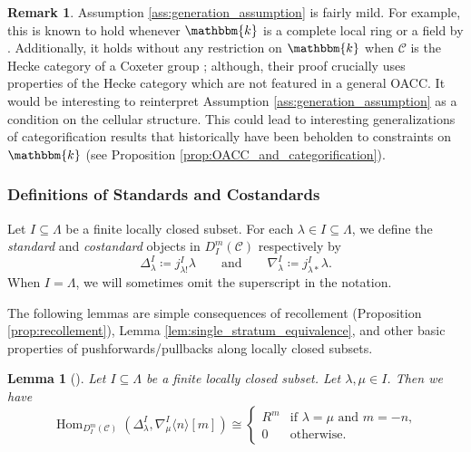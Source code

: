 \documentclass{amsart}
\renewcommand{\k}{\mathbbm{k}}
\newcommand{\scrC}{\mathcal{C}}
\DeclareMathOperator{\Hom}{Hom}
\newtheorem{lemma}[subsubsection]{Lemma}
\theoremstyle{definition}
\newtheorem{remark}[subsubsection]{Remark}
\numberwithin{equation}{subsection}
\begin{document}
\begin{remark}
    Assumption \ref{ass:generation_assumption} is fairly mild. For example, this is known to hold whenever $\k$ is a complete local ring or a field by \cite[Proposition 2.24]{EL}.
    Additionally, it holds without any restriction on $\k$ when $\scrC$ is the Hecke category of a Coxeter group \cite[Lemma 6.2]{ARV}; although, their proof crucially uses properties of the Hecke category which are not featured in a general OACC.
    It would be interesting to reinterpret Assumption \ref{ass:generation_assumption} as a condition on the cellular structure. 
    This could lead to interesting generalizations of categorification results that historically have been beholden to constraints on $\k$ (see Proposition \ref{prop:OACC_and_categorification}).   
\end{remark}

\subsubsection{Definitions of Standards and Costandards}

Let $I \subseteq \Lambda$ be a finite locally closed subset.
For each $\lambda \in I \subseteq \Lambda$, we define the \emph{standard} and \emph{costandard} objects in $D_I^m (\scrC)$ respectively by
\[\Delta_{\lambda}^I \coloneq j_{\lambda !}^I \lambda \qquad\text{and}\qquad \nabla_{\lambda}^I \coloneq j_{\lambda *}^I \lambda.\]
When $I = \Lambda$, we will sometimes omit the superscript in the notation.

The following lemmas are simple consequences of recollement (Proposition \ref{prop:recollement}), Lemma \ref{lem:single_stratum_equivalence}, and other basic properties of pushforwards/pullbacks along locally closed subsets.

\begin{lemma}[{\cite[Lemma 6.6]{ARV}}]\label{lem:hom_vanishing_for_stds_and_costds}
    Let $I \subseteq \Lambda$ be a finite locally closed subset. Let $\lambda, \mu \in I$.
    Then we have
    \[\Hom_{D_I^m (\scrC)} (\Delta_{\lambda}^I, \nabla_{\mu}^I \langle n \rangle [m]) \cong \begin{cases} R^m & \text{if } \lambda=\mu\text{ and }m=-n, \\ 0 & \text{otherwise.}\end{cases}\]
\end{lemma}
\end{document}
